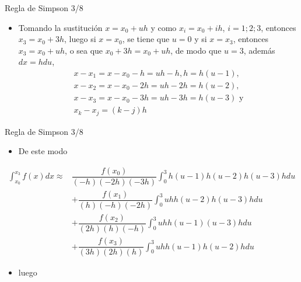 \documentclass[12pt]{beamer}
\begin{document}
\begin{frame}{Regla de Simpson 3/8}
  \begin{itemize}
    \item Tomando la sustituci\'on $x = x_0 + uh$ y como $x_i = x_0 + ih$, $i = 1; 2; 3$,
    entonces $x_3 = x_0 + 3h$, luego si $x = x_0$, se tiene que $u = 0$ y si $x = x_3$,
    entonces $x_3 = x_0 + uh$, o sea que $x_0 + 3h = x_0 + uh$, de modo que $u = 3$,
    adem\'as $dx = hdu$,
    $$
    \begin{array}{l}
    x - x_1 = x-x_0-h = uh - h, h = h(u-1),\\
    x - x_2 = x-x_0-2h = uh-2h = h(u-2),\\
    x-x_3 = x-x_0-3h = uh-3h = h(u-3) \text{ y} \\ 
    x_k - x_j = (k - j)h
    \end{array}
    $$    
  \end{itemize}
\end{frame}
\begin{frame}{Regla de Simpson 3/8}
  \begin{itemize}
    \item De este modo
  \end{itemize}{
    \footnotesize{
    \begin{align*}
        \int_{x_0}^{x_3}f(x)dx \approx & \dfrac{f(x_0)}{(-h)(-2h)(-3h)}\int_{0}^{3}h(u-1)h(u-2)h(u-3)hdu \\
        & + \dfrac{f(x_1)}{(h)(-h)(-2h)}\int_{0}^{3}uhh(u-2)h(u-3)hdu\\
        & + \dfrac{f(x_2)}{(2h)(h)(-h)}\int_{0}^{3}uhh(u-1)(u-3)hdu \\
        & + \dfrac{f(x_3)}{(3h)(2h)(h)}\int_{0}^{3}uhh(u-1)h(u-2)hdu
    \end{align*}}}
    \begin{itemize}
      \item<2-> luego
    \end{itemize}
\end{frame}
\end{document}
